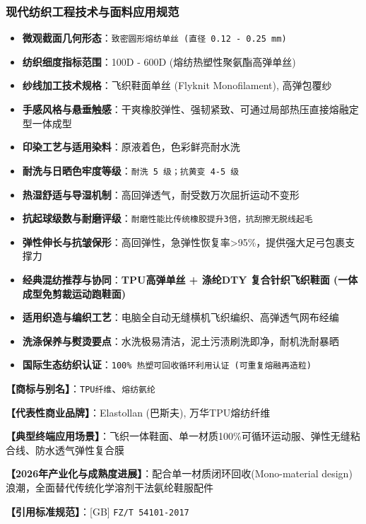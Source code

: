 \documentclass[11pt,openright,twoside,UTF8]{ctexbook}
\begin{document}
\subsubsection*{现代纺织工程技术与面料应用规范}
\begin{itemize} \setlength{\itemsep}{2pt}
    \item \textbf{微观截面几何形态}：\texttt{致密圆形熔纺单丝 (直径 0.12 - 0.25 mm)}
    \item \textbf{纺织细度指标范围}：100D - 600D (熔纺热塑性聚氨酯高弹单丝)
    \item \textbf{纱线加工技术规格}：飞织鞋面单丝 (Flyknit Monofilament), 高弹包覆纱
    \item \textbf{手感风格与悬垂触感}：干爽橡胶弹性、强韧紧致、可通过局部热压直接熔融定型一体成型
    \item \textbf{印染工艺与适用染料}：原液着色，色彩鲜亮耐水洗
    \item \textbf{耐洗与日晒色牢度等级}：\texttt{耐洗 5 级；抗黄变 4-5 级}
    \item \textbf{热湿舒适与导湿机制}：高回弹透气，耐受数万次屈折运动不变形
    \item \textbf{抗起球级数与耐磨评级}：\texttt{耐磨性能比传统橡胶提升3倍，抗刮擦无脱线起毛}
    \item \textbf{弹性伸长与抗皱保形}：高回弹性，急弹性恢复率\textgreater{}95\%，提供强大足弓包裹支撑力
    \item \textbf{经典混纺推荐与协同}：\textbf{TPU高弹单丝 + 涤纶DTY 复合针织飞织鞋面 (一体成型免剪裁运动跑鞋面)}
    \item \textbf{适用织造与编织工艺}：电脑全自动无缝横机飞织编织、高弹透气网布经编
    \item \textbf{洗涤保养与熨烫要点}：水洗极易清洁，泥土污渍刷洗即净，耐机洗耐暴晒
    \item \textbf{国际生态纺织认证}：\texttt{100\% 热塑可回收循环利用认证 (可重复熔融再造粒)}
\end{itemize}
\vspace{0.2cm}

\noindent\textbf{【商标与别名】}：\texttt{TPU纤维}、\texttt{熔纺氨纶}\par
\noindent\textbf{【代表性商业品牌】}：Elastollan (巴斯夫), 万华TPU熔纺纤维\par
\noindent\textbf{【典型终端应用场景】}：飞织一体鞋面、单一材质100\%可循环运动服、弹性无缝粘合线、防水透气弹性复合膜\par
\noindent\textbf{【2026年产业化与成熟度进展】}：配合单一材质闭环回收(Mono-material design)浪潮，全面替代传统化学溶剂干法氨纶鞋服配件\par
\noindent\textbf{【引用标准规范】}：[GB] \texttt{FZ/T 54101-2017}\par
\vspace{0.5cm}
\end{document}

